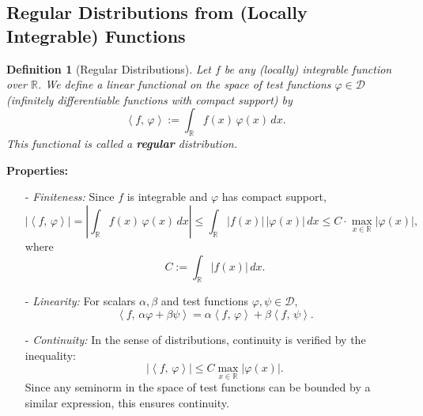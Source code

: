 \documentclass[11pt,openany]{book}
\newcommand{\dist}[2]{\left\langle #1,\, #2 \right\rangle}
\newtheorem{definition}{Definition}[section]
\begin{document}
\subsection{Regular Distributions from (Locally Integrable) Functions}
\label{sec:regular-dist}

\begin{definition}[Regular Distributions]
Let $f$ be any (locally) integrable function over $\mathbb{R}$. We define a linear functional on the space of test functions $\varphi \in \mathcal{D}$ (infinitely differentiable functions with compact support) by
\[
\dist{f}{\varphi} := \int_{\mathbb{R}} f(x)\,\varphi(x)\,dx.
\]
This functional is called a \textbf{regular} distribution.
\end{definition}

\noindent
\textbf{Properties:}

\begin{itemize}
    \item[-] \emph{Finiteness:} Since $f$ is integrable and $\varphi$ has compact support,
    \[
    \left|\dist{f}{\varphi}\right|
    = \left| \int_{\mathbb{R}} f(x)\,\varphi(x)\,dx \right|
    \leq \int_{\mathbb{R}} |f(x)|\,|\varphi(x)|\,dx
    \leq C \cdot \max_{x \in \mathbb{R}}|\varphi(x)|,
    \]
    where
    \[
    C := \int_{\mathbb{R}} |f(x)|\,dx.
    \]

    \item[-] \emph{Linearity:} For scalars $\alpha, \beta$ and test functions $\varphi, \psi \in \mathcal{D}$,
    \[
    \dist{f}{\alpha \varphi + \beta \psi}
    = \alpha \dist{f}{\varphi} + \beta \dist{f}{\psi}.
    \]

    \item[-] \emph{Continuity:} In the sense of distributions, continuity is verified by the inequality:
    \[
    \left|\dist{f}{\varphi}\right| \leq C \max_{x \in \mathbb{R}}|\varphi(x)|.
    \]
    Since any seminorm in the space of test functions can be bounded by a similar expression, this ensures continuity.
\end{itemize}
\end{document}

